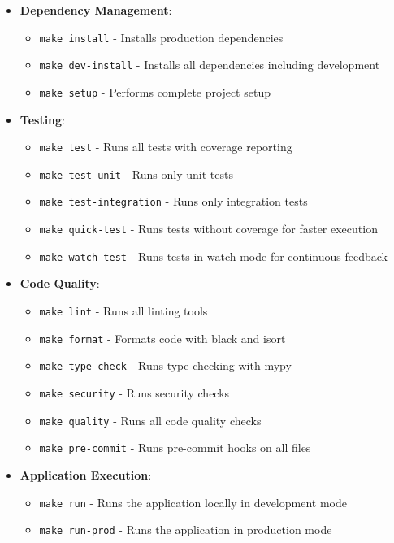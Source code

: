 \begin{itemize}
    \item \textbf{Dependency Management}:
    \begin{itemize}
        \item \texttt{make install} - Installs production dependencies
        \item \texttt{make dev-install} - Installs all dependencies including development
        \item \texttt{make setup} - Performs complete project setup
    \end{itemize}
    
    \item \textbf{Testing}:
    \begin{itemize}
        \item \texttt{make test} - Runs all tests with coverage reporting
        \item \texttt{make test-unit} - Runs only unit tests
        \item \texttt{make test-integration} - Runs only integration tests
        \item \texttt{make quick-test} - Runs tests without coverage for faster execution
        \item \texttt{make watch-test} - Runs tests in watch mode for continuous feedback
    \end{itemize}
    
    \item \textbf{Code Quality}:
    \begin{itemize}
        \item \texttt{make lint} - Runs all linting tools
        \item \texttt{make format} - Formats code with black and isort
        \item \texttt{make type-check} - Runs type checking with mypy
        \item \texttt{make security} - Runs security checks
        \item \texttt{make quality} - Runs all code quality checks
        \item \texttt{make pre-commit} - Runs pre-commit hooks on all files
    \end{itemize}
    
    \item \textbf{Application Execution}:
    \begin{itemize}
        \item \texttt{make run} - Runs the application locally in development mode
        \item \texttt{make run-prod} - Runs the application in production mode
    \end{itemize}
    

\end{itemize}
